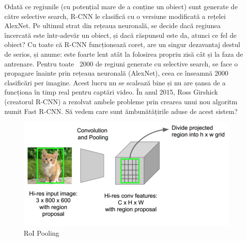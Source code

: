 Odată ce regiunile (cu potențial mare de a conține un obiect) sunt generate de către selective search, R-CNN le clasifică cu o versiune modificată a rețelei AlexNet. Pe ultimul strat din rețeaua neuronală, se decide dacă regiunea încercată este într-adevăr un obiect, și dacă răspunsul este da, atunci ce fel de obiect?\newline
Cu toate că R-CNN funcționează coret, are un singur dezavantaj destul de serios, și anume: este foarte lent atât la folosirea propriu zisă cât și la faza de antrenare. Pentru toate ~2000 de regiuni generate cu selective search, se face o propagare înainte prin rețeaua neuronală (AlexNet), ceea ce înseamnă 2000 clasificări per imagine. Acest lucru nu se scalează bine și nu are șansa de a funcționa în timp real pentru captări video.\newline
În anul 2015, Ross Girshick (creatorul R-CNN) a rezolvat ambele probleme prin crearea unui nou algoritm numit Fast R-CNN. Să vedem care sunt ămbunătățirile aduse de acest sistem?
\begin{figure}[h!]
    	\centering
	\captionsetup{justification=centering, margin=2cm}
	\includegraphics[width=1.0\textwidth]{figures/fast_rcnn.png}
	\caption{RoI Pooling \cite{historyCNN}}
	\label{fig:roi_pooling}
\end{figure}
